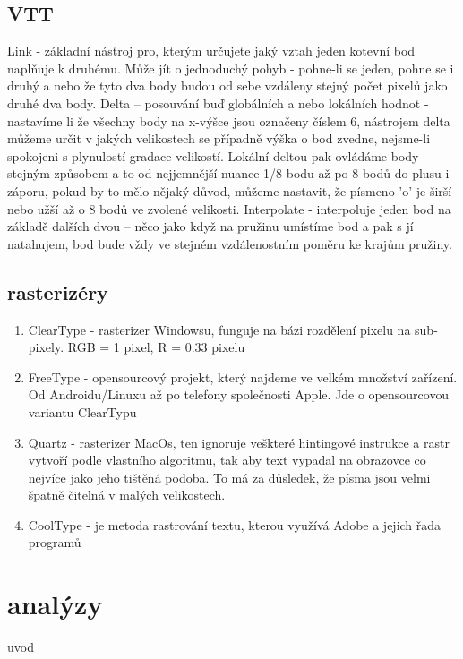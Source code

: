 \documentclass{article}
\begin{document}
\subsection{VTT}
Link - základní nástroj pro, kterým určujete jaký vztah jeden kotevní bod naplňuje k druhému. Může jít o jednoduchý pohyb - pohne-li se jeden, pohne se i druhý a nebo že tyto dva body budou od sebe vzdáleny stejný počet pixelů jako druhé dva body.
Delta – posouvání buď globálních a nebo lokálních hodnot - nastavíme li že všechny body na x-výšce jsou označeny číslem 6, nástrojem delta můžeme určit v jakých velikostech se případně výška o bod zvedne, nejsme-li spokojeni s plynulostí gradace velikostí. Lokální deltou pak ovládáme body stejným způsobem a to od nejjemnější nuance 1/8 bodu až po 8 bodů do plusu i záporu, pokud by to mělo nějaký důvod, můžeme nastavit, že písmeno 'o' je širší nebo užší až o 8 bodů ve zvolené velikosti.
Interpolate - interpoluje jeden bod na základě dalších dvou – něco jako když na pružinu umístíme bod a pak s jí natahujem, bod bude vždy ve stejném vzdálenostním poměru ke krajům pružiny.

\subsection{rasterizéry}
\begin{enumerate}
\item ClearType - rasterizer Windowsu, funguje na bázi rozdělení pixelu na sub-pixely. RGB = 1 pixel, R = 0.33 pixelu

\item FreeType - opensourcový projekt, který najdeme ve velkém množství zařízení. Od Androidu/Linuxu až po telefony společnosti Apple. Jde o opensourcovou variantu ClearTypu

\item Quartz - rasterizer MacOs, ten ignoruje veškteré hintingové instrukce a rastr vytvoří podle vlastního algoritmu, tak aby text vypadal na obrazovce co nejvíce jako jeho tištěná podoba. To má za důsledek, že písma jsou velmi špatně čitelná v malých velikostech.

\item CoolType - je metoda rastrování textu, kterou využívá Adobe a jejich řada programů
\end{enumerate}

\section{analýzy}
uvod
\end{document}
